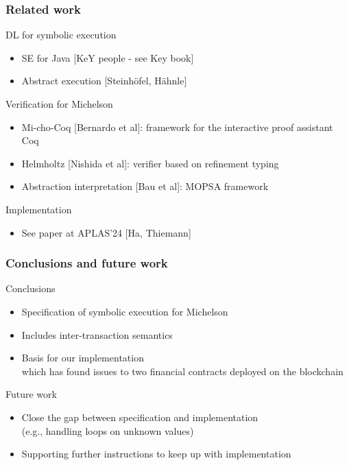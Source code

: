 \documentclass[aspectratio=1610]{beamer}
\begin{document}
\begin{frame}
  \frametitle{Related work}
  \begin{block}{DL for symbolic execution}
    \begin{itemize}
    \item SE for Java [KeY people - see Key book]
    \item Abstract execution [Steinh\"{o}fel, H\"{a}hnle]
    \end{itemize}
  \end{block}
  \begin{block}{Verification for Michelson}
    \begin{itemize}
    \item Mi-cho-Coq [Bernardo et al]: framework for the interactive proof assistant Coq
    \item Helmholtz [Nishida et al]: verifier based on refinement typing
    \item Abstraction interpretation [Bau et al]: MOPSA framework
    \end{itemize}
  \end{block}
  \begin{block}{Implementation}
    \begin{itemize}
    \item See paper at APLAS'24 [Ha, Thiemann]
    \end{itemize}
  \end{block}
\end{frame}
\begin{frame}
  \frametitle{Conclusions and future work}
  \begin{block}{Conclusions}
  \begin{itemize}
  \item Specification of symbolic execution for Michelson
  \item Includes inter-transaction semantics
  \item Basis for our implementation\\
    which has found issues to two financial contracts deployed on the blockchain
  \end{itemize}
\end{block}
  \begin{block}{Future work}
    \begin{itemize}
    \item Close the gap between specification and implementation \\ (e.g., handling loops on unknown values)
    \item Supporting further instructions to keep up with implementation
    \end{itemize}
  \end{block}
\end{frame}
\end{document}
